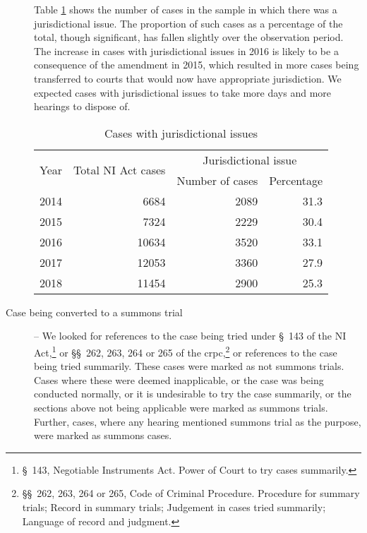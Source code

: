 \documentclass[12pt,a4paper]{article}
\begin{document}
\begin{description}
		Table \ref{tab:jurisdiction_yearWise} shows the number of cases in the sample in which there was a jurisdictional issue. The proportion of such cases as a percentage of the total, though significant, has fallen slightly over the observation period. The increase in cases with jurisdictional issues in 2016 is likely to be a consequence of the amendment in 2015, which resulted in more cases being transferred to courts that would now have appropriate jurisdiction.
		We expected cases with jurisdictional issues to take more days and more hearings to dispose of. 
		
		\begin{table}[!ht]
			\caption{Cases with jurisdictional issues}\label{tab:jurisdiction_yearWise}
			\centering
			\footnotesize
			\begin{tabular}{@{}lrrr@{}}
				\toprule
				\multirow{2}{*}{Year} & \multirow{2}{*}{Total NI Act cases} & \multicolumn{2}{c}{Jurisdictional issue}\\
				\cmidrule{3-4}
				&& Number of cases & Percentage \\
				\midrule %
				2014 & 6684 & 2089 & 31.3 \\
				2015 & 7324 & 2229 & 30.4 \\
				2016 & 10634 & 3520 & 33.1 \\
				2017 & 12053 & 3360 & 27.9 \\
				2018 & 11454 & 2900 & 25.3 \\
				\bottomrule
			\end{tabular}
		\end{table}
		
		\item[]
		
		\item [Case being converted to a summons trial] -- We looked for references to the case being tried under \S~143 of the NI Act,\footnote{\S~143, Negotiable Instruments Act. Power of Court to try cases summarily.} or \S\S~262, 263, 264 or 265 of the \gls{crpc},\footnote{\S\S~262, 263, 264 or 265, Code of Criminal Procedure. Procedure for summary trials; Record in summary trials; Judgement in cases tried summarily; Language of record and judgment.} or references to the case being tried summarily. These cases were marked as not summons trials. Cases where these were deemed inapplicable, or the case was being conducted normally, or it is undesirable to try the case summarily, or the sections above not being applicable were marked as summons trials. Further, cases, where any hearing mentioned summons trial as the purpose, were marked as summons cases.
		

\end{description}
\end{document}
